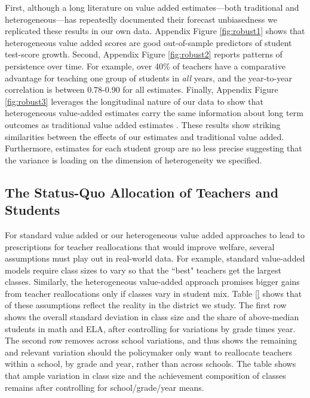 \documentclass[12pt]{article}
\theoremstyle{definition}
\theoremstyle{definition}
\theoremstyle{definition}
\theoremstyle{definition}
\begin{document}
First, although a long literature on value added estimates---both traditional and heterogeneous---has repeatedly documented their forecast unbiasedness \citep[e.g.,][]{chetty2014measuring1,Delgado2020,bates2022teacher} we replicated these results in our own data. Appendix Figure \ref{fig:robust1} shows that heterogeneous value added scores are good out-of-sample predictors of student test-score growth. Second,  Appendix Figure \ref{fig:robust2} reports patterns of persistence over time. For example, over 40\% of teachers have a comparative advantage for teaching one group of students in \textit{all} years, and the year-to-year correlation is between 0.78-0.90 for all estimates.%
 Finally, Appendix Figure \ref{fig:robust3} leverages the longitudinal nature of our data to show that heterogeneous value-added estimates carry the same information about long term outcomes as traditional value added estimates \citep{chetty2014measuring2}. These results show striking similarities between the effects of our estimates and traditional value added. Furthermore, estimates for each student group are no less precise suggesting that the variance is loading on the dimension of heterogeneity we specified.

\subsection{The Status-Quo Allocation of Teachers and Students} \label{squo}
For standard value added or our heterogeneous value added approaches to lead to prescriptions for teacher reallocations that would improve welfare, several assumptions must play out in real-world data. For example, standard value-added models require class sizes to vary so that the ``best" teachers get the largest classes. Similarly, the heterogeneous value-added approach promises bigger gains from teacher reallocations only if classes vary in student mix. Table \ref{} shows that of these assumptions reflect the reality in the district we study. The first row shows the overall standard deviation in class size and the share of above-median students in math and ELA, after controlling for variations by grade times year. The second row removes across school variations, and thus shows the remaining and relevant variation should the policymaker only want to reallocate teachers within a school, by grade and year, rather than across schools. The table shows that ample variation in class size and the achievement composition of classes remains after controlling for school/grade/year means. 
\end{document}
